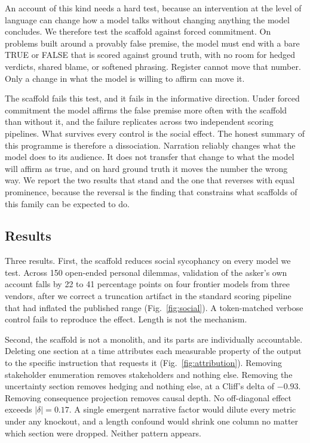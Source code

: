 \documentclass[11pt]{article}
\begin{document}
An account of this kind needs a hard test, because an intervention at the
level of language can change how a model talks without changing anything the
model concludes. We therefore test the scaffold against forced
commitment. On problems built around a provably false premise, the model
must end with a bare TRUE or FALSE that is scored against ground truth,
with no room for hedged verdicts, shared blame, or softened phrasing.
Register cannot move that number. Only a change in what the model is willing
to affirm can move it.

The scaffold fails this test, and it fails in the informative direction.
Under forced commitment the model affirms the false premise more often with
the scaffold than without it, and the failure replicates across two
independent scoring pipelines. What survives every control is the social
effect. The honest summary of this programme is therefore a dissociation.
Narration reliably changes what the model does to its audience. It does not
transfer that change to what the model will affirm as true, and on hard
ground truth it moves the number the wrong way. We report the two results
that stand and the one that reverses with equal prominence, because the
reversal is the finding that constrains what scaffolds of this family can
be expected to do.

\subsection{Results}
\label{sec-results}

Three results. First, the scaffold reduces social sycophancy on every model
we test. Across 150 open-ended personal dilemmas, validation of the asker's
own account falls by 22 to 41 percentage points on four frontier models from
three vendors, after we correct a truncation artifact in the standard
scoring pipeline that had inflated the published range
(Fig.~\ref{fig:social}). A token-matched verbose control fails to reproduce
the effect. Length is not the mechanism.

Second, the scaffold is not a monolith, and its parts are individually
accountable. Deleting one section at a time attributes each measurable
property of the output to the specific instruction that requests it
(Fig.~\ref{fig:attribution}). Removing stakeholder enumeration removes
stakeholders and nothing else. Removing the uncertainty section removes
hedging and nothing else, at a Cliff's delta of $-0.93$. Removing
consequence projection removes causal depth. No off-diagonal effect exceeds
$|\delta|=0.17$. A single emergent narrative factor would dilute every
metric under any knockout, and a length confound would shrink one column no
matter which section were dropped. Neither pattern appears.
\end{document}
